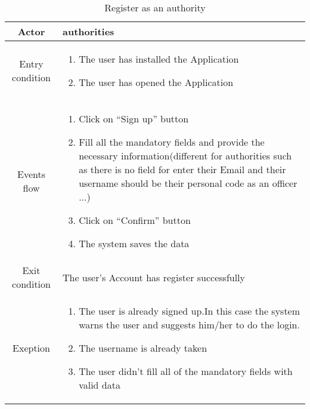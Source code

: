 \documentclass{article}
\begin{document}
		\begin{table} [H]
		\begin{center}
		\caption{Register as an authority}
		\begin{tabular}{|c|p{8cm}|}
			\hline
			Actor&authorities\\
			\hline
			Entry condition&
				\begin{enumerate}
					\item The user has installed the Application
					\item The user has opened the Application
				\end{enumerate}\\
			\hline
			Events flow&
			\begin{enumerate}
			\item Click on “Sign up” button
			\item Fill all the mandatory fields and provide the necessary information(different for authorities such as there is no 
			field for enter their Email and their username should be their personal code as an officer ...)
			\item Click on “Confirm” button
			\item The system saves the data
			
			\end{enumerate}\\
			\hline
			Exit condition& The user's Account has register successfully\\
			\hline
			Exeption&
			\begin{enumerate}
			\item The user is already signed up.In this case the system warns the user and suggests him/her to do the login.
			\item The username is already taken
			\item The user didn’t fill all of the mandatory fields with valid data
			
			\end{enumerate}\\
			\hline
		\end{tabular}
				
		\end{center}


		\end{table} 
	
\end{document}
